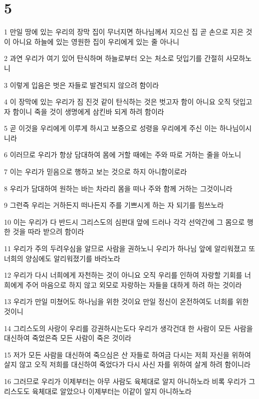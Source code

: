 \chapter{5}

\par 1 만일 땅에 있는 우리의 장막 집이 무너지면 하나님께서 지으신 집 곧 손으로 지은 것이 아니요 하늘에 있는 영원한 집이 우리에게 있는 줄 아나니
\par 2 과연 우리가 여기 있어 탄식하며 하늘로부터 오는 처소로 덧입기를 간절히 사모하노니
\par 3 이렇게 입음은 벗은 자들로 발견되지 않으려 함이라
\par 4 이 장막에 있는 우리가 짐 진것 같이 탄식하는 것은 벗고자 함이 아니요 오직 덧입고자 함이니 죽을 것이 생명에게 삼킨바 되게 하려 함이라
\par 5 곧 이것을 우리에게 이루게 하시고 보증으로 성령을 우리에게 주신 이는 하나님이시니라
\par 6 이러므로 우리가 항상 담대하여 몸에 거할 때에는 주와 따로 거하는 줄을 아노니
\par 7 이는 우리가 믿음으로 행하고 보는 것으로 하지 아니함이로라
\par 8 우리가 담대하여 원하는 바는 차라리 몸을 떠나 주와 함께 거하는 그것이니라
\par 9 그런즉 우리는 거하든지 떠나든지 주를 기쁘시게 하는 자 되기를 힘쓰노라
\par 10 이는 우리가 다 반드시 그리스도의 심판대 앞에 드러나 각각 선악간에 그 몸으로 행한 것을 따라 받으려 함이라
\par 11 우리가 주의 두려우심을 알므로 사람을 권하노니 우리가 하나님 앞에 알리워졌고 또 너희의 양심에도 알리워졌기를 바라노라
\par 12 우리가 다시 너희에게 자천하는 것이 아니요 오직 우리를 인하여 자랑할 기회를 너희에게 주어 마음으로 하지 않고 외모로 자랑하는 자들을 대하게 하려 하는 것이라
\par 13 우리가 만일 미쳤어도 하나님을 위한 것이요 만일 정신이 온전하여도 너희를 위한 것이니
\par 14 그리스도의 사랑이 우리를 강권하시는도다 우리가 생각건대 한 사람이 모든 사람을 대신하여 죽었은즉 모든 사람이 죽은 것이라
\par 15 저가 모든 사람을 대신하여 죽으심은 산 자들로 하여금 다시는 저희 자신을 위하여 살지 않고 오직 저희를 대신하여 죽었다가 다시 사신 자를 위하여 살게 하려 함이니라
\par 16 그러므로 우리가 이제부터는 아무 사람도 육체대로 알지 아니하노라 비록 우리가 그리스도도 육체대로 알았으나 이제부터는 이같이 알지 아니하노라

